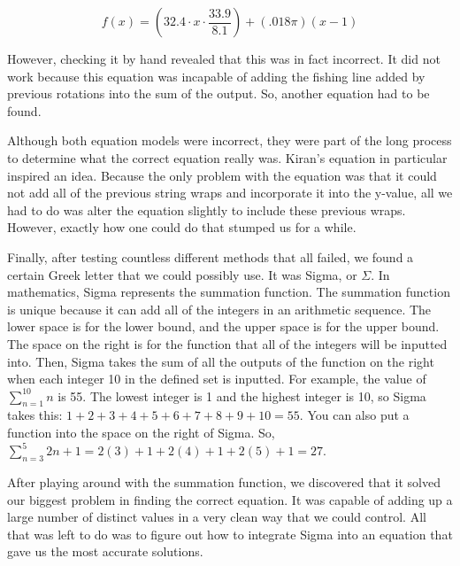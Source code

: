 $$f(x)=(32.4\cdot x \cdot \frac{33.9}{8.1}) + (.018\pi)(x-1)
$$

However, checking it by hand revealed that this was in fact incorrect. It did not work because this equation was incapable of adding the fishing line added by previous rotations into the sum of the output. So, another equation had to be found.

Although both equation models were incorrect, they were part of the long process to determine what the correct equation really was. Kiran’s equation in particular inspired an idea. Because the only problem with the equation was that it could not add all of the previous string wraps and incorporate it into the y-value, all we had to do was alter the equation slightly to include these previous wraps. However, exactly how one could do that stumped us for a while.

Finally, after testing countless different methods that all failed, we found a certain Greek letter that we could possibly use. It was Sigma, or $\Sigma$. In mathematics, Sigma represents the summation function. The summation function is unique because it can add all of the integers in an arithmetic sequence. The lower space is for the lower bound, and the upper space is for the upper bound. The space on the right is for the function that all of the integers will be inputted into. Then, Sigma takes the sum of all the outputs of the function on the right when each integer 10 in the defined set is inputted. For example, the value of $\sum_{n=1}^{10} n$ is 55. The lowest integer is 1 and the highest integer is 10, so Sigma takes this: $1+2+3+4+5+6+7+8+9+10=55$. You can also put a function into the space on the right of Sigma. So, $\sum_{n=3}^{5} 2n+1 =2(3)+1+2(4)+1+2(5)+1 = 27.$

After playing around with the summation function, we discovered that it solved our biggest problem in finding the correct equation. It was capable of adding up a large number of distinct values in a very clean way that we could control. All that was left to do was to figure out how to integrate Sigma into an equation that gave us the most accurate solutions.


